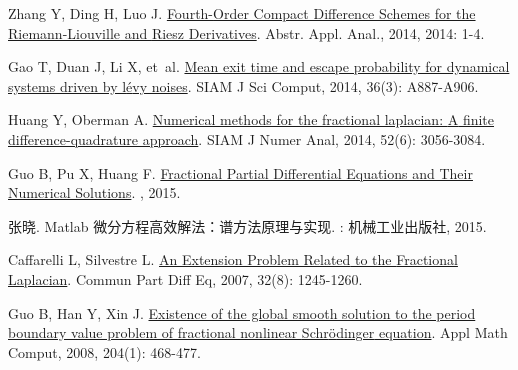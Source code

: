 \begin{thebibliography}{79}
    Zhang Y, Ding H, Luo J.
    \newblock \href{http://www.hindawi.com/journals/aaa/2014/540692/}{Fourth-{{Order Compact Difference Schemes}} for the {{Riemann-Liouville}} and {{Riesz Derivatives}}}\allowbreak[J].
    \newblock Abstr. Appl. Anal., 2014, 2014: 1-4.
    
    Gao T, Duan J, Li X, et~al.
    \newblock \href{https://doi.org/10.1137/120897262}{Mean exit time and escape probability for dynamical systems driven by l{\'e}vy noises}\allowbreak[J].
    \newblock SIAM J Sci Comput, 2014, 36\allowbreak (3): A887-A906.
    
    Huang Y, Oberman A.
    \newblock \href{https://doi.org/10.1137/140954040}{Numerical methods for the fractional laplacian: {{A}} finite difference-quadrature approach}\allowbreak[J].
    \newblock SIAM J Numer Anal, 2014, 52\allowbreak (6): 3056-3084.
    
    Guo B, Pu X, Huang F.
    \newblock \href{https://www.worldscientific.com/worldscibooks/10.1142/9543}{{Fractional Partial Differential Equations and Their Numerical Solutions}}\allowbreak[M].
    , 2015.
    
    {张晓}.
    \newblock Matlab 微分方程高效解法：谱方法原理与实现\allowbreak[M].
    : {机械工业出版社}, 2015.
    
    Caffarelli L, Silvestre L.
    \newblock \href{http://www.tandfonline.com/doi/abs/10.1080/03605300600987306}{An {{Extension Problem Related}} to the {{Fractional Laplacian}}}\allowbreak[J].
    \newblock Commun Part Diff Eq, 2007, 32\allowbreak (8): 1245-1260.
    
    Guo B, Han Y, Xin J.
    \newblock \href{https://www.sciencedirect.com/science/article/pii/S0096300308005341}{Existence of the global smooth solution to the period boundary value problem of fractional nonlinear {{Schr{\"o}dinger}} equation}\allowbreak[J].
    \newblock Appl Math Comput, 2008, 204\allowbreak (1): 468-477.
    

\end{thebibliography}
